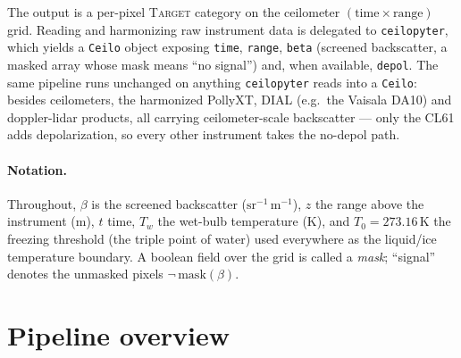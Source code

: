 \documentclass[11pt,a4paper]{article}
\newcommand{\betau}{\ensuremath{\mathrm{sr^{-1}\,m^{-1}}}}
\newcommand{\Tzero}{\ensuremath{T_0}}
\newcommand{\code}[1]{\texttt{#1}}
\newcommand{\target}[1]{\textsc{#1}}
\begin{document}
The output is a per-pixel \target{Target} category on the ceilometer
$(\text{time}\times\text{range})$ grid. Reading and harmonizing raw instrument
data is delegated to \code{ceilopyter}, which yields a \code{Ceilo} object
exposing \code{time}, \code{range}, \code{beta} (screened backscatter, a masked
array whose mask means ``no signal'') and, when available, \code{depol}. The same
pipeline runs unchanged on anything \code{ceilopyter} reads into a \code{Ceilo}:
besides ceilometers, the harmonized PollyXT, DIAL (e.g.\ the Vaisala DA10) and
doppler-lidar products, all carrying ceilometer-scale backscatter --- only the
CL61 adds depolarization, so every other instrument takes the no-depol path.

\paragraph{Notation.}
Throughout, $\beta$ is the screened backscatter (\betau), $z$ the range above the
instrument (m), $t$ time, $T_w$ the wet-bulb temperature (K), and
$\Tzero = 273.16\,\mathrm{K}$ the freezing threshold (the triple point of water)
used everywhere as the liquid/ice temperature boundary. A boolean field over the
grid is called a \emph{mask}; ``signal'' denotes the unmasked pixels
$\neg\,\mathrm{mask}(\beta)$.

\section{Pipeline overview}
\end{document}
